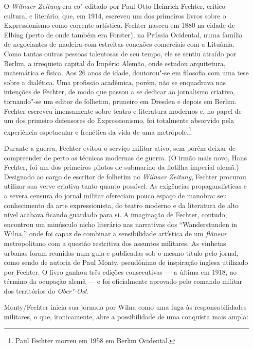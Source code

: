 O \emph{Wilnaer Zeitung} era co"-editado por Paul Otto Heinrich Fechter,
crítico cultural e literário, que, em 1914, escreveu um dos primeiros
livros sobre o Expressionismo como corrente artística. Fechter nasceu em
1880 na cidade de Elbing (perto de onde também era Forster), na Prússia
Ocidental, numa família de negociantes de madeira com estreitas conexões
comerciais com a Lituânia. Como tantas outras pessoas talentosas de seu
tempo, ele se sentiu atraído por Berlim, a irrequieta capital do Império
Alemão, onde estudou arquitetura, matemática e física. Aos 26 anos de
idade, doutorou"-se em filosofia com uma tese sobre a dialética. Uma
profissão acadêmica, porém, não se enquadrava nas intenções de Fechter,
de modo que passou a se dedicar ao jornalismo criativo, tornando"-se um
editor de folhetim, primeiro em Dresden e depois em Berlim. Fechter
escreveu imensamente sobre teatro e literatura modernos e, no papel de
um dos primeiro defensores do Expressionismo, foi totalmente absorvido
pela experiência espetacular e frenética da vida de uma
metrópole.\footnote{Paul Fechter morreu em 1958 em Berlim Ocidental.}

Durante a guerra, Fechter evitou o serviço militar ativo, sem porém
deixar de compreender de perto as técnicas modernas de guerra. (O irmão
mais novo, Hans Fechter, foi um dos primeiros pilotos de submarino da
flotilha imperial alemã.) Designado ao cargo de escritor de folhetim no
\emph{Wilnaer Zeitung}, Fechter procurou utilizar sua verve criativa
tanto quanto possível. As exigências propagandísticas e a severa censura
do jornal militar ofereciam pouco espaço de manobra: seu conhecimento da
arte expressionista, do teatro moderno e da literatura de alto nível
acabava ficando guardado para si. A imaginação de Fechter, contudo,
encontrou um minúsculo nicho literário nas narrativas dos
``Wanderstunden in Wilna,'' onde foi capaz de combinar a sensibilidade
artística de um \emph{flâneur} metropolitano com a questão restritiva
dos assuntos militares. As vinhetas urbanas foram reunidas num guia e
publicadas sob o mesmo título pelo jornal, como sendo de autoria de Paul
Monty, pseudônimo de inspiração inglesa utilizado por Fechter. O livro
ganhou três edições consecutivas --- a última em 1918, ao término da
ocupação alemã --- e foi oficialmente aprovado pelo comando militar dos
territórios do \emph{Ober"-Ost}.

Monty/Fechter inicia sua jornada por Wilna como uma fuga às
responsabilidades militares, o que, ironicamente, abre a possibilidade
de uma conquista mais ampla:

